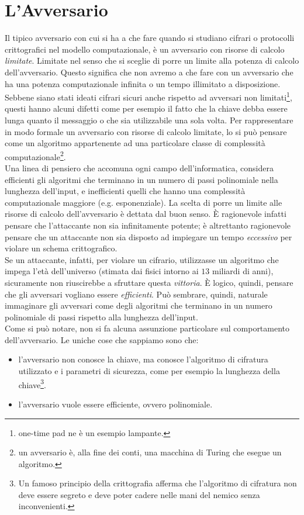 \documentclass[a4paper,openright,twoside,12pt]{report}
\begin{document}
\section{L'Avversario}
Il tipico avversario con cui si ha a che fare quando si studiano cifrari o protocolli crittografici nel modello computazionale,
è un avversario con risorse di calcolo \emph{limitate}. Limitate nel senso che si sceglie di porre un limite alla potenza di calcolo dell'avversario.
Questo significa che non avremo a che fare con un avversario che ha una potenza computazionale infinita o un tempo illimitato a disposizione.\\
Sebbene siano stati ideati cifrari sicuri anche rispetto ad avversari non limitati\footnote{one-time pad ne \`e un esempio lampante.}, questi hanno alcuni difetti come per esempio
il fatto che la chiave debba essere lunga quanto il messaggio o che sia utilizzabile una sola volta.
Per rappresentare in modo formale un avversario con risorse di calcolo limitate, lo si può pensare come un algoritmo appartenente ad una 
particolare classe di complessit\`a computazionale\footnote{un avversario \`e, alla fine dei conti, una macchina di Turing che esegue un algoritmo.}. \\
Una linea di pensiero che accomuna ogni campo dell'informatica, considera efficienti gli algoritmi che terminano in un numero di passi polinomiale nella lunghezza dell'input, e inefficienti 
quelli che hanno una complessit\`a computazionale maggiore (e.g. esponenziale). 
La scelta di porre un limite alle risorse di calcolo dell'avversario \`e dettata dal buon senso.
\`E ragionevole infatti pensare che l'attaccante non sia infinitamente potente; \`e altrettanto ragionevole pensare che un attaccante non sia disposto ad impiegare un tempo \emph{eccessivo} per violare un schema crittografico.\\
Se un attaccante, infatti, per violare un cifrario, utilizzasse un algoritmo che impega l'et\`a dell'universo (stimata dai fisici intorno ai $13$ miliardi di anni), sicuramente non riuscirebbe a sfruttare questa \emph{vittoria}.
\`E logico, quindi, pensare che gli avversari vogliano essere \emph{efficienti}.
Pu\`o sembrare, quindi, naturale immaginare gli avversari come degli algoritmi che terminano in un numero polinomiale di passi
rispetto alla lunghezza dell'input.\\Come si pu\`o notare, non si fa alcuna assunzione particolare sul comportamento dell'avversario. Le uniche cose che sappiamo sono che:
\begin{itemize}
 \item l'avversario non conosce la chiave, ma conosce l'algoritmo di cifratura utilizzato  e i parametri di sicurezza, come per esempio la lunghezza della chiave\footnote{Un famoso principio della crittografia afferma che
l'algoritmo di cifratura non deve essere segreto e deve poter cadere nelle mani del nemico senza inconvenienti.}. 
 \item l'avversario vuole essere efficiente, ovvero polinomiale.
\end{itemize}
\end{document}
